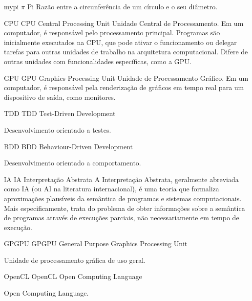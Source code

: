 

\novosimbolo
    {mypi} %
    {\ensuremath{\pi}} %
    {Pi} %
    {Razão entre a circunferência de um círculo e o seu diâmetro.} %



\novoacronimo
    {CPU}
    {CPU}
    {{Central Processing Unit}}
    {
        Unidade Central de Processamento. Em um computador, é responsável pelo 
        processamento principal. Programas são inicialmente executados na CPU, 
        que pode ativar o funcionamento ou delegar tarefas para outras unidades 
        de trabalho na arquitetura computacional. Difere de outras unidades com 
        funcionalidades específicas, como a \gls{GPU}.
    }

\novoacronimo
    {GPU}
    {GPU}
    {{Graphics Processing Unit}}
    {
        Unidade de Processamento Gráfico. Em um computador, é responsável pela 
        renderização de gráficos em tempo real para um dispositivo de saída, 
        como monitores.
    }
    
    
\novoacronimo
    {TDD}
    {TDD}
    {{Test-Driven Development}}
    {
        Desenvolvimento orientado a testes.
        
    }
    
\novoacronimo
    {BDD}
    {BDD}
    {{Behaviour-Driven Development}}
    {
        Desenvolvimento orientado a comportamento.
        
    }
    
\novoacronimo
    {IA} %
    {IA} %
    {{Interpretação Abstrata}} %
    {
        A Interpretação Abstrata, geralmente abreviada como IA (ou AI na 
        literatura internacional), é uma teoria que formaliza aproximações 
        plausíveis da semântica de programas e sistemas computacionais. Mais 
        especificamente, trata do problema de obter informações sobre a 
        semântica de programas através de execuções parciais, não 
        necessariamente em tempo de execução.
    }

\novoacronimo
    {GPGPU}
    {GPGPU}
    {{General Purpose Graphics Processing Unit}}
    {
        Unidade de processamento gráfica de uso geral.
                
    }


\novoacronimo
    {OpenCL}
    {OpenCL}
    {{Open Computing Language}}
    {
        Open Computing Language.
                
    }
    
